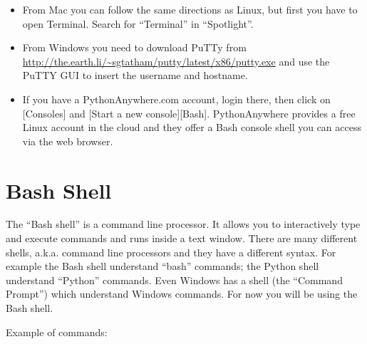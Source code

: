 \documentclass[justified,sixbynine]{tufte-book}
\theoremstyle{plain}%
\theoremstyle{definition}
\theoremstyle{remark}
\begin{document}
\begin{fullwidth}
\begin{itemize}
\item
From Mac you can follow the same directions as Linux, but first you have to open Terminal. Search for ``Terminal'' in ``Spotlight''.

\item
From Windows you need to download PuTTy from
\url{http://the.earth.li/~sgtatham/putty/latest/x86/putty.exe}
and use the PuTTY GUI to insert the username and hostname.

\item
If you have a PythonAnywhere.com account, login there, then click on [Consoles] and [Start a new console][Bash]. PythonAnywhere provides a free Linux account in the cloud and they offer a Bash console shell you can access via the web browser.

\end{itemize}

\section{Bash Shell}

The ``Bash shell'' is a command line processor. It allows you to interactively type and execute commands and runs inside a text window. There are many different shells, a.k.a. command line processors and they have a different syntax. For example the Bash shell understand ``bash'' commands; the Python shell understand ``Python'' commands. Even Windows has a shell (the ``Command Prompt'') which understand Windows commands. For now you will be using the Bash shell.

Example of commands:


\end{fullwidth}
\end{document}
